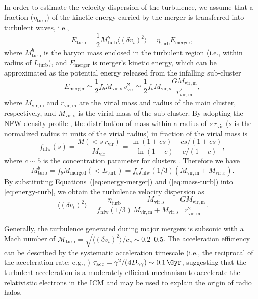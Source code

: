 \documentclass[modern]{aastex62}
\newcommand{\R}[1]{\mathrm{#1}}
\begin{document}
In order to estimate the velocity dispersion of the turbulence, we assume
that a fraction ($\eta_{\R{turb}}$) of the kinetic energy carried by the
merger is transferred into turbulent waves, i.e.,
\begin{equation}
  \label{eq:energy-turb}
  E_{\R{turb}} = \frac{1}{2} M_{\R{turb}}^b
    \langle (\delta{v_t})^2 \rangle = \eta_{\R{turb}} E_{\R{merger}},
\end{equation}
where
$M_{\R{turb}}^b$ is the baryon mass enclosed in the turbulent region
(i.e., within radius of $L_{\R{turb}}$),
and $E_{\R{merger}}$ is merger's kinetic energy, which can be approximated
as the potential energy released from the infalling sub-cluster
\begin{equation}
  \label{eq:energy-merger}
  E_{\R{merger}} \simeq \frac{1}{2} f_b M_{\R{vir,s}} \,v^2_{\R{vir}}
    \simeq \frac{1}{2} f_b M_{\R{vir,s}}
    \frac{G M_{\R{vir,m}}}{r^2_{\R{vir,m}}},
\end{equation}
where
$M_{\R{vir,m}}$ and $r_{\R{vir,m}}$ are the virial mass and radius of the
main cluster, respectively, and $M_{\R{vir,s}}$ is the virial mass of the
sub-cluster.
By adopting the NFW density profile \citep{navarro1997}, the distribution
of mass within a radius of $s \,r_{\R{vir}}$ ($s$ is the normalized radius
in units of the virial radius) in fraction of the virial mass is
\begin{equation}
  \label{eq:mass-dist-nfw}
  f_{\R{nfw}}(s) = \frac{M(< s \,r_{\R{vir}})}{M_{\R{vir}}} =
    \frac{\ln(1 + c s) - c s / (1 + c s)}{\ln(1 + c) - c / (1 + c)},
\end{equation}
where
$c \sim 5$ is the concentration parameter for clusters \citep{lokas2001}.
Therefore we have
\begin{equation}
  \label{eq:mass-turb}
  M_{\R{turb}}^b = f_b M_{\R{merged}}(<L_{\R{turb}})
    = f_b f_{\R{nfw}}(1/3) (M_{\R{vir,m}} + M_{\R{vir,s}}).
\end{equation}
By substituting Equations~(\ref{eq:energy-merger}) and (\ref{eq:mass-turb})
into \autoref{eq:energy-turb}, we obtain the turbulence velocity dispersion
as
\begin{equation}
  \label{eq:turb-velocity-dispersion}
  \langle (\delta{v_t})^2 \rangle =
    \frac{\eta_{\R{turb}}}{f_{\R{nfw}}(1/3)}
    \frac{M_{\R{vir,s}}}{M_{\R{vir,m}} + M_{\R{vir,s}}}
    \frac{G M_{\R{vir,m}}}{r^2_{\R{vir,m}}}.
\end{equation}

Generally, the turbulence generated during major mergers is subsonic
with a Mach number of
$\mathcal{M}_{\R{turb}} = \sqrt{\langle (\delta{v_t})^2 \rangle} / c_s
  \sim \numrange{0.2}{0.5}$.
The acceleration efficiency can be described by the systematic
acceleration timescale (i.e., the reciprocal of the acceleration rate;
e.g., \citealt{brunetti2011})
$\tau_{\R{acc}} = \gamma^2 / (4 D_{\gamma\gamma}) \sim \SI{0.1}{\Gyr}$,
suggesting that the turbulent acceleration is a moderately efficient
mechanism to accelerate the relativistic electrons in the ICM and
may be used to explain the origin of radio halos.
\end{document}
